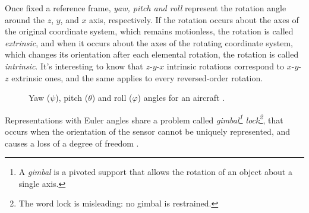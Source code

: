 Once fixed a reference frame, \textit{yaw, pitch and roll} represent the rotation angle around the $z$, $y$, and $x$ axis, respectively.
If the rotation occurs about the axes of the original coordinate system, which remains motionless, the rotation is called \textit{extrinsic}, and when it occurs about the axes of the rotating coordinate system, which changes its orientation after each elemental rotation, the rotation is called \textit{intrinsic}. It's interesting to know that $z$-$y$-$x$ intrinsic rotations correspond to $x$-$y$-$z$ extrinsic ones, and the same applies to every reversed-order rotation.

\begin{center}
	\begin{figure}[ht]
		\caption{Yaw ($\psi$), pitch ($\theta$) and roll ($\varphi$) angles for an aircraft \cite{WikimediaPlane}.}
	\end{figure}
\end{center}
Representations with Euler angles share a problem called \textit{gimbal\footnote{A \textit{gimbal} is a pivoted support that allows the rotation of an object about a single axis.} lock\footnote{The word lock is misleading: no gimbal is restrained.}}, that occurs when the orientation of the sensor cannot be uniquely represented, and causes a loss of a degree of freedom \cite{Dil18}.

